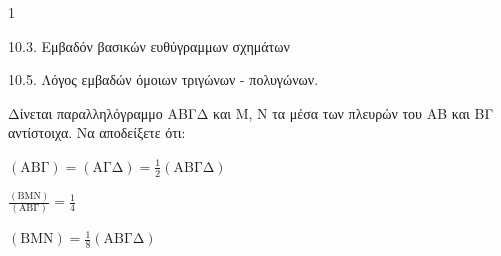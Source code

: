 \begin{ylh}{1}
    \item 10.3. Εμβαδόν βασικών ευθύγραμμων σχημάτων
    \item 10.5. Λόγος εμβαδών όμοιων τριγώνων - πολυγώνων.
\end{ylh}
Δίνεται παραλληλόγραμμο ΑΒΓΔ και Μ, Ν τα μέσα των πλευρών του ΑΒ και ΒΓ αντίστοιχα. Να αποδείξετε ότι:
\begin{alist}
\item $(\text{ΑΒΓ}) = (\text{ΑΓΔ}) = \frac{1}{2}(\text{ΑΒΓΔ})$ 
\item $\frac{(\text{ΒΜΝ})}{(\text{ΑΒΓ})} = \frac{1}{4}$ 
\item $(\text{ΒΜΝ}) = \frac{1}{8}(\text{ΑΒΓΔ})$ 
\end{alist}